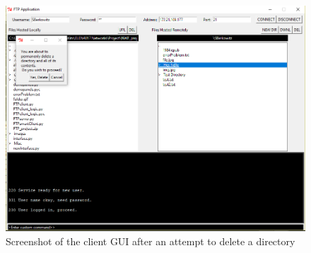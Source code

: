 \documentclass[10pt,twocolumn]{witseiepaper}
\begin{document}
\begin{appendix}
\begin{figure}[h]
\centering
\includegraphics[width=0.8\columnwidth]{delDir.png}
\caption{Screenshot of the client GUI after an attempt to delete a directory}
\raggedright
\label{fig:ClientDel}
\end{figure}

\end{appendix} 	

\end{document}
